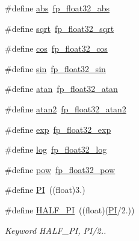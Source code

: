 \begin{DoxyCompactItemize}
\item 
\#define \mbox{\hyperlink{a00023_a7eee275c4550a21c03be987913256c82}{abs}}~\mbox{\hyperlink{a00023_a50dbb1be8035ed17c71df34d180056e0}{fp\+\_\+float32\+\_\+abs}}
\item 
\#define \mbox{\hyperlink{a00023_aa8418f27fe28830a7fb62322463f15e0}{sqrt}}~\mbox{\hyperlink{a00023_a310b7eb83e737130e48a8d4b0853efd5}{fp\+\_\+float32\+\_\+sqrt}}
\item 
\#define \mbox{\hyperlink{a00023_a57a66355e043ccefc17aca9338a2b748}{cos}}~\mbox{\hyperlink{a00023_a76d63763a1fbbbed015ad39ff22a1a99}{fp\+\_\+float32\+\_\+cos}}
\item 
\#define \mbox{\hyperlink{a00023_a28642ecbd9d1e77ab5a140a460f47d83}{sin}}~\mbox{\hyperlink{a00023_ae57383891f734bc754b6ade61fed3677}{fp\+\_\+float32\+\_\+sin}}
\item 
\#define \mbox{\hyperlink{a00023_a0526fb3466fec955862c2cee3110a6ab}{atan}}~\mbox{\hyperlink{a00023_afff3776b0834631c841e3799f545f7a0}{fp\+\_\+float32\+\_\+atan}}
\item 
\#define \mbox{\hyperlink{a00023_ac371f13b8648d84164686c8f32aa6ed8}{atan2}}~\mbox{\hyperlink{a00023_aa7b8601248d31c15f917e4d8f4f6e9d9}{fp\+\_\+float32\+\_\+atan2}}
\item 
\#define \mbox{\hyperlink{a00023_a4bb9b8ff973345c3b4770d31cfb71ea8}{exp}}~\mbox{\hyperlink{a00023_a595d6a7d9a0a116f0db5bd4cfdbcd166}{fp\+\_\+float32\+\_\+exp}}
\item 
\#define \mbox{\hyperlink{a00023_a25274c13d478263ec5322541d7bbfeee}{log}}~\mbox{\hyperlink{a00023_a694db5e30e3f76718f29bacd4e044135}{fp\+\_\+float32\+\_\+log}}
\item 
\#define \mbox{\hyperlink{a00023_a4b7fecf5b1bc24739831b0aaca6ffaf7}{pow}}~\mbox{\hyperlink{a00023_ac888f98a6e5d89837b647d2c81725836}{fp\+\_\+float32\+\_\+pow}}
\item 
\#define \mbox{\hyperlink{a00023_a598a3330b3c21701223ee0ca14316eca}{PI}}~((float)3.)
\item 
\mbox{\label{a00023_ae3ec3219e4eee3b0992bfd59c2e2bc42}} 
\#define \mbox{\hyperlink{a00023_ae3ec3219e4eee3b0992bfd59c2e2bc42}{H\+A\+L\+F\+\_\+\+PI}}~((float)(\mbox{\hyperlink{a00023_a598a3330b3c21701223ee0ca14316eca}{PI}}/2.))
\begin{DoxyCompactList}\small\item\em Keyword H\+A\+L\+F\+\_\+\+PI, P\+I/2.. \end{DoxyCompactList}\item 

\end{DoxyCompactItemize}
